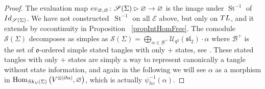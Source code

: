 \documentclass[11pt]{article}
\numberwithin{equation}{section}
\numberwithin{equation}{section}
\newcommand{\abss}[1]{\left\vert #1 \right\vert}
\newcommand{\St}{\operatorname{St}}
\newcommand{\Hom}{\operatorname{Hom}}
\newcommand{\Uq}{\mathcal{U}_{q^2}(\mathfrak{sl}_2)}
\begin{document}
\begin{proof}
The evaluation map ${\rm ev}_{\varnothing,\varnothing}\colon \mathscr{S}(\Sigma)\rhd \varnothing\to\varnothing$ is the image under $\St^{-1}$ of ${\rm Id}_{\mathscr{S}(\Sigma)}$. We have not constructed~$\St^{-1}$ on all $\mathcal{E}$ above, but only on ${\rm TL}$, and it extends by cocontinuity in Proposition~ \ref{propIntHomFree}. The comodule~$\mathscr{S}(\Sigma)$ decomposes as simples as $\mathscr{S}(\Sigma) = \bigoplus_{\alpha \in \mathcal{B}^+} \Uq\cdot \alpha$ where $\mathcal{B}^+$ is the set of $\mathfrak{o}$-ordered simple stated tangles with only + states, see \cite[Theorem~4.6(b)]{Cos}. These stated tangles with only + states are simply a way to represent canonically a tangle without state information, and again in the following we will see $\alpha$ as a morphism in $\Hom_{{\rm Sk}_\mathcal{V}(\Sigma)}\big(V^{\otimes \abss{\partial \alpha}},\varnothing\big)$, which is actually $\psi_{hv}^{-1}(\alpha)$.


\end{proof}
\end{document}
